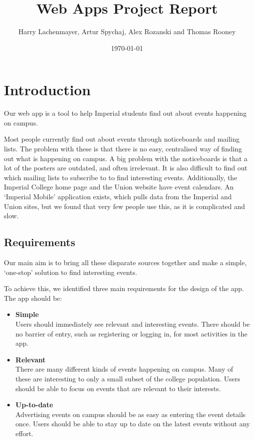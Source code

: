 \documentclass[11pt]{article}
\begin{document}
\title{Web Apps Project Report}

\author{Harry Lachenmayer, Artur Spychaj, Alex Rozanski and Thomas Rooney}

\date{\today}         %

\maketitle            %

\section {Introduction}

Our web app is a tool to help Imperial students find out about events happening on campus.

Most people currently find out about events through noticeboards and mailing lists. The problem with these is that there is no easy, centralised way of finding out what is happening on campus. A big problem with the noticeboards is that a lot of the posters are outdated, and often irrelevant. It is also difficult to find out which mailing lists to subscribe to to find interesting events. Additionally, the Imperial College home page and the Union website have event calendars. An `Imperial Mobile' application exists, which pulls data from the Imperial and Union sites, but we found that very few people use this, as it is complicated and slow.

\subsection{Requirements}

Our main aim is to bring all these disparate sources together and make a simple, `one-stop' solution to find interesting events.

To achieve this, we identified three main requirements for the design of the app. The app should be:

\begin{itemize}
    \item \textbf{Simple} \\[0.5em] Users should immediately see relevant and interesting events. There should be no barrier of entry, such as registering or logging in, for most activities in the app.

    \item \textbf{Relevant} \\[0.5em] There are many different kinds of events happening on campus. Many of these are interesting to only a small subset of the college population. Users should be able to focus on events that are relevant to their interests.

    \item \textbf{Up-to-date} \\[0.5em] Advertising events on campus should be as easy as entering the event details once. Users should be able to stay up to date on the latest events without any effort.

\end{itemize}
\end{document}
